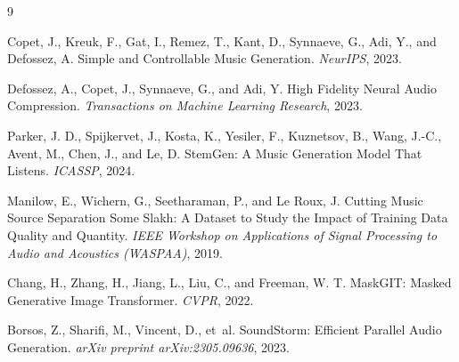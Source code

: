 \documentclass{article}
\begin{document}
\begin{thebibliography}{9}

Copet, J., Kreuk, F., Gat, I., Remez, T., Kant, D., Synnaeve, G., Adi, Y., and Defossez, A.
\newblock Simple and Controllable Music Generation.
\newblock \emph{NeurIPS}, 2023.

Defossez, A., Copet, J., Synnaeve, G., and Adi, Y.
\newblock High Fidelity Neural Audio Compression.
\newblock \emph{Transactions on Machine Learning Research}, 2023.

Parker, J. D., Spijkervet, J., Kosta, K., Yesiler, F., Kuznetsov, B., Wang, J.-C., Avent, M., Chen, J., and Le, D.
\newblock StemGen: A Music Generation Model That Listens.
\newblock \emph{ICASSP}, 2024.

Manilow, E., Wichern, G., Seetharaman, P., and Le Roux, J.
\newblock Cutting Music Source Separation Some Slakh: A Dataset to Study the Impact of Training Data Quality and Quantity.
\newblock \emph{IEEE Workshop on Applications of Signal Processing to Audio and Acoustics (WASPAA)}, 2019.

Chang, H., Zhang, H., Jiang, L., Liu, C., and Freeman, W. T.
\newblock MaskGIT: Masked Generative Image Transformer.
\newblock \emph{CVPR}, 2022.

Borsos, Z., Sharifi, M., Vincent, D., et~al.
\newblock SoundStorm: Efficient Parallel Audio Generation.
\newblock \emph{arXiv preprint arXiv:2305.09636}, 2023.

\end{thebibliography}
\end{document}
